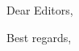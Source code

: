 \documentclass{letter}
\date{October 20, 2016} %
\begin{document}
\begin{letter}{}
\opening{Dear Editors,}

\closing{Best regards,\\
 \\
}

\end{letter}
\end{document}
